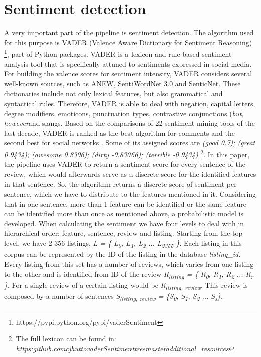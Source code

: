 \section{Sentiment detection}
A very important part of the pipeline is sentiment detection. The algorithm used for this purpose is VADER (Valence Aware Dictionary for Sentiment Reasoning) \footnote{https://pypi.python.org/pypi/vaderSentiment}, part of Python packages. VADER is a lexicon and rule-based sentiment analysis tool that is specifically attuned to sentiments expressed in social media. For building the valence scores for sentiment intensity, VADER considers several well-known sources, such as ANEW, SentiWordNet 3.0 and SenticNet. These dictionaries include not only lexical features, but also grammatical and syntactical rules.
Therefore, VADER is able to deal with negation, capital letters, degree modifiers, emoticons, punctuation types, contrastive conjunctions (\textit{but, however}and slangs.  Based on the comparisons of 22 sentiment mining tools of the last decade, VADER is ranked as the best algorithm for comments and the second best for social networks \cite{ribeiro2015benchmark}. Some of its assigned scores are \textit{(good 0.7); (great 0.9434); (awesome	0.8306); (dirty -0.83066); (terrible -0.9434)} \footnote{The full lexicon can be found in: \textit{https:\/\/github.com\/cjhutto\/vaderSentiment\/tree\/master\/additional\_resources}}. In this paper, the pipeline uses VADER to return a sentiment score for every sentence of the review, which would afterwards serve as a discrete score for the identified features in that sentence. So, the algorithm returns a discrete score of sentiment per sentence, which we have to distribute to the features mentioned in it. Considering that in one sentence, more than 1 feature can be identified or the same feature can be identified more than once as mentioned above, a probabilistic model is developed. When calculating the sentiment we have four levels to deal with in hierarchical order: feature, sentence, review and listing. Starting from the top level, we have 2 356 listings, \textit{L = \{ L\textsubscript{0}, L\textsubscript{1},  L\textsubscript{2} ... L\textsubscript{2355} \}}. Each listing in this corpus can be represented by the ID of the listing in the database \textit{listing\_id}. Every listing from this set has a number of reviews, which varies from one listing to the other and is identified from ID of the review \textit{R\textsubscript{listing} = \{ R\textsubscript{0}, R\textsubscript{1},  R\textsubscript{2} ... R\textsubscript{r} \}}. For a single review of a certain listing would be \textit{R\textsubscript{listing, review}}. This review is composed by a number of sentences \textit{S\textsubscript{listing, review} = \{S\textsubscript{0}, S\textsubscript{1}, S\textsubscript{2} ... S\textsubscript{s}\}}. 
